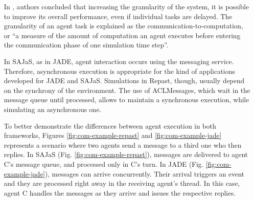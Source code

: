 \documentclass[a4paper,twoside]{article}
\begin{document}
In \cite{mengistu2008scalability}, authors concluded that increasing the granularity of the system, it is possible to improve its overall performance, even if individual tasks are delayed. The granularity of an agent task is explained as the communication-to-computation, or ``a measure of the amount of computation an agent executes before entering the communication phase of one simulation time step''.

In SAJaS, as in JADE, agent interaction occurs using the messaging service. Therefore, asynchronous execution is appropriate for the kind of applications developed for JADE and SAJaS. Simulations in Repast, though, usually depend on the synchrony of the environment. The use of ACLMessages, which wait in the message queue until processed, allows to maintain a synchronous execution, while simulating an asynchronous one.

To better demonstrate the differences between agent execution in both frameworks, Figures \ref{fig:com-example-repast} and \ref{fig:com-example-jade} represents a scenario where two agents send a message to a third one who then replies. In SAJaS (Fig. \ref{fig:com-example-repast}), messages are delivered to agent C's message queue, and processed only in C's turn. In JADE (Fig. \ref{fig:com-example-jade}), messages can arrive concurrently. Their arrival triggers an event and they are processed right away in the receiving agent's thread. In this case, agent C handles the messages as they arrive and issues the respective replies.
\end{document}
